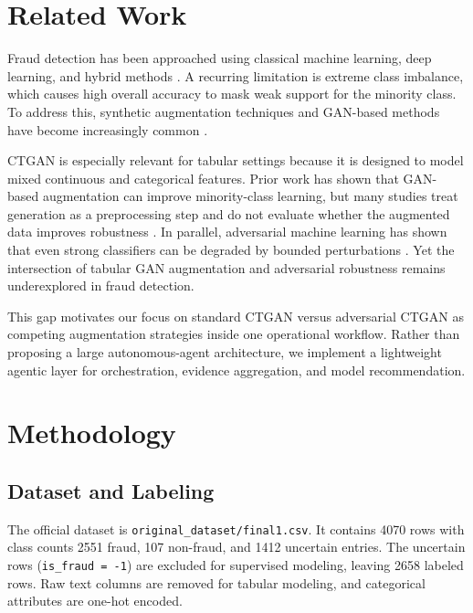 \documentclass[conference]{IEEEtran}
\begin{document}
\section{Related Work}

Fraud detection has been approached using classical machine learning, deep learning, and hybrid methods \cite{west2015fraud,almazroi2023online}. A recurring limitation is extreme class imbalance, which causes high overall accuracy to mask weak support for the minority class. To address this, synthetic augmentation techniques and GAN-based methods have become increasingly common \cite{strelcenia2023survey,wang2024gan,mienye2024hybrid}.

CTGAN is especially relevant for tabular settings because it is designed to model mixed continuous and categorical features. Prior work has shown that GAN-based augmentation can improve minority-class learning, but many studies treat generation as a preprocessing step and do not evaluate whether the augmented data improves robustness \cite{strelcenia2023survey}. In parallel, adversarial machine learning has shown that even strong classifiers can be degraded by bounded perturbations \cite{goodfellow2015explaining,madry2018towards}. Yet the intersection of tabular GAN augmentation and adversarial robustness remains underexplored in fraud detection.

This gap motivates our focus on standard CTGAN versus adversarial CTGAN as competing augmentation strategies inside one operational workflow. Rather than proposing a large autonomous-agent architecture, we implement a lightweight agentic layer for orchestration, evidence aggregation, and model recommendation.

\section{Methodology}

\subsection{Dataset and Labeling}

The official dataset is \texttt{original\_dataset/final1.csv}. It contains 4070 rows with class counts 2551 fraud, 107 non-fraud, and 1412 uncertain entries. The uncertain rows (\texttt{is\_fraud = -1}) are excluded for supervised modeling, leaving 2658 labeled rows. Raw text columns are removed for tabular modeling, and categorical attributes are one-hot encoded.
\end{document}
